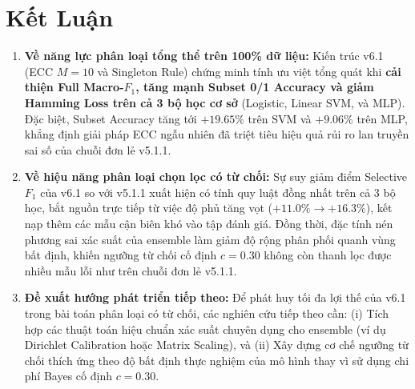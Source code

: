 \documentclass[11pt,a4paper]{article}
\begin{document}
\section{Kết Luận}
\begin{enumerate}
    \item \textbf{Về năng lực phân loại tổng thể trên 100\% dữ liệu:} Kiến trúc v6.1 (ECC $M=10$ và Singleton Rule) chứng minh tính ưu việt tổng quát khi \textbf{cải thiện Full Macro-$F_1$, tăng mạnh Subset 0/1 Accuracy và giảm Hamming Loss trên cả 3 bộ học cơ sở} (Logistic, Linear SVM, và MLP). Đặc biệt, Subset Accuracy tăng tới $+19.65\%$ trên SVM và $+9.06\%$ trên MLP, khẳng định giải pháp ECC ngẫu nhiên đã triệt tiêu hiệu quả rủi ro lan truyền sai số của chuỗi đơn lẻ v5.1.1.
    \item \textbf{Về hiệu năng phân loại chọn lọc có từ chối:} Sự suy giảm điểm Selective $F_1$ của v6.1 so với v5.1.1 xuất hiện có tính quy luật đồng nhất trên cả 3 bộ học, bắt nguồn trực tiếp từ việc độ phủ tăng vọt ($+11.0\% \to +16.3\%$), kết nạp thêm các mẫu cận biên khó vào tập đánh giá. Đồng thời, đặc tính nén phương sai xác suất của ensemble làm giảm độ rộng phân phối quanh vùng bất định, khiến ngưỡng từ chối cố định $c = 0.30$ không còn thanh lọc được nhiều mẫu lỗi như trên chuỗi đơn lẻ v5.1.1.
    \item \textbf{Đề xuất hướng phát triển tiếp theo:} Để phát huy tối đa lợi thế của v6.1 trong bài toán phân loại có từ chối, các nghiên cứu tiếp theo cần: (i) Tích hợp các thuật toán hiệu chuẩn xác suất chuyên dụng cho ensemble (ví dụ Dirichlet Calibration hoặc Matrix Scaling), và (ii) Xây dựng cơ chế ngưỡng từ chối thích ứng theo độ bất định thực nghiệm của mô hình thay vì sử dụng chi phí Bayes cố định $c = 0.30$.
\end{enumerate}
\end{document}
